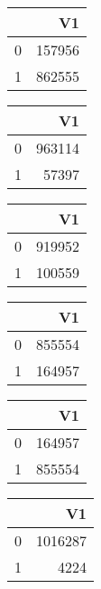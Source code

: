 \bigskip\bigskip
\centering
\begin{tabular}{rr}
  \hline
 & V1 \\ 
  \hline
0 & 157956 \\ 
  1 & 862555 \\ 
   \hline
\end{tabular}

\bigskip\bigskip
\centering
\begin{tabular}{rr}
  \hline
 & V1 \\ 
  \hline
0 & 963114 \\ 
  1 & 57397 \\ 
   \hline
\end{tabular}

\bigskip\bigskip
\centering
\begin{tabular}{rr}
  \hline
 & V1 \\ 
  \hline
0 & 919952 \\ 
  1 & 100559 \\ 
   \hline
\end{tabular}

\bigskip\bigskip
\centering
\begin{tabular}{rr}
  \hline
 & V1 \\ 
  \hline
0 & 855554 \\ 
  1 & 164957 \\ 
   \hline
\end{tabular}

\bigskip\bigskip
\centering
\begin{tabular}{rr}
  \hline
 & V1 \\ 
  \hline
0 & 164957 \\ 
  1 & 855554 \\ 
   \hline
\end{tabular}

\bigskip\bigskip
\centering
\begin{tabular}{rr}
  \hline
 & V1 \\ 
  \hline
0 & 1016287 \\ 
  1 & 4224 \\ 
   \hline
\end{tabular}

